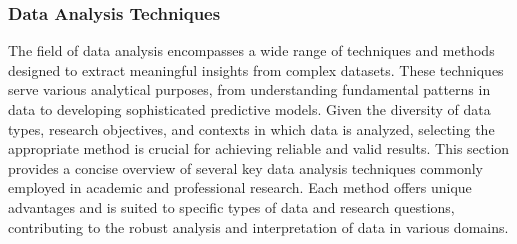 \subsubsection{Data Analysis Techniques}

The field of data analysis encompasses a wide range of techniques and methods designed to extract meaningful insights from complex datasets. These techniques serve various analytical purposes, from understanding fundamental patterns in data to developing sophisticated predictive models. Given the diversity of data types, research objectives, and contexts in which data is analyzed, selecting the appropriate method is crucial for achieving reliable and valid results. This section provides a concise overview of several key data analysis techniques commonly employed in academic and professional research. Each method offers unique advantages and is suited to specific types of data and research questions, contributing to the robust analysis and interpretation of data in various domains.

